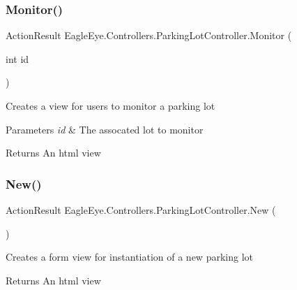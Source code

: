 \subsubsection{\texorpdfstring{Monitor()}{Monitor()}}
{\footnotesize\ttfamily Action\+Result Eagle\+Eye.\+Controllers.\+Parking\+Lot\+Controller.\+Monitor (\begin{DoxyParamCaption}\item[{int}]{id }\end{DoxyParamCaption})}



Creates a view for users to monitor a parking lot 


\begin{DoxyParams}{Parameters}
{\em id} & The assocated lot to monitor\\
\hline
\end{DoxyParams}
\begin{DoxyReturn}{Returns}
An html view
\end{DoxyReturn}
\mbox{\label{class_eagle_eye_1_1_controllers_1_1_parking_lot_controller_a15e34fac7a5623494db6ac9ef11e7021}} 
\subsubsection{\texorpdfstring{New()}{New()}}
{\footnotesize\ttfamily Action\+Result Eagle\+Eye.\+Controllers.\+Parking\+Lot\+Controller.\+New (\begin{DoxyParamCaption}{ }\end{DoxyParamCaption})}



Creates a form view for instantiation of a new parking lot 

\begin{DoxyReturn}{Returns}
An html view
\end{DoxyReturn}
\mbox{\label{class_eagle_eye_1_1_controllers_1_1_parking_lot_controller_aa0484b67b0469d5c81421d793405ac50}} 
